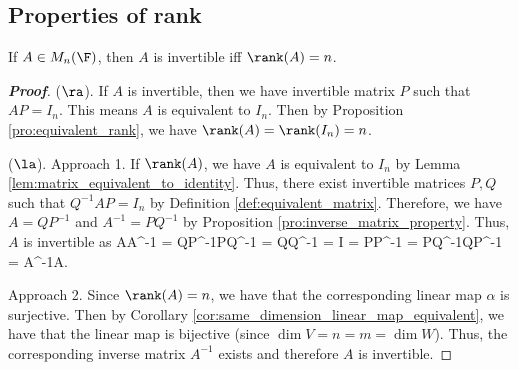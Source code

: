 


\subsection{Properties of rank}



\begin{theorem}\label{thm:invertible_full_rank}
If $A\in M_n(\F)$, then $A$ is invertible iff $\rank(A) = n$.%
\end{theorem}

\begin{proof}[\bf Proof]
($\ra$). If $A$ is invertible, then we have invertible matrix $P$ such that $AP = I_n$. This means $A$ is equivalent to $I_n$. Then by Proposition \ref{pro:equivalent_rank}, we have $\rank(A) =\rank(I_n) = n$.

($\la$). Approach 1. If $\rank(A)$, we have $A$ is equivalent to $I_n$ by Lemma \ref{lem:matrix_equivalent_to_identity}. Thus, there exist invertible matrices $P,Q$ such that $Q^{-1}AP = I_n$ by Definition \ref{def:equivalent_matrix}. Therefore, we have $A = QP^{-1}$ and $A^{-1} = PQ^{-1}$ by Proposition \ref{pro:inverse_matrix_property}. Thus, $A$ is invertible as
\be
AA^{-1} = QP^{-1}PQ^{-1} = QQ^{-1} = I = PP^{-1} = PQ^{-1}QP^{-1} = A^{-1}A.
\ee

Approach 2. Since $\rank(A) =n$, we have that the corresponding linear map $\alpha$ is surjective. Then by Corollary \ref{cor:same_dimension_linear_map_equivalent}, we have that the linear map is bijective (since $\dim V = n=m = \dim W$). Thus, the corresponding inverse matrix $A^{-1}$ exists and therefore $A$ is invertible.
\end{proof}

